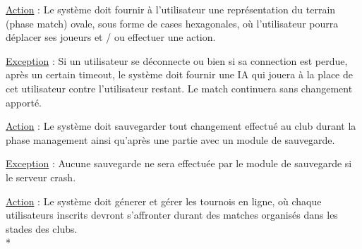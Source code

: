 \documentclass[a4paper]{article}
\begin{document}
\begin{description}[style=nextline]
			\item[Représentation phase match :]
			\begin{description}[leftmargin=*] %
				\item[]
				\item \underline{Action} : Le système doit fournir à l'utilisateur une représentation du terrain (phase match) ovale, sous forme de cases hexagonales, où l'utilisateur pourra déplacer ses joueurs et / ou effectuer une action.
				\item \underline{Exception} : Si un utilisateur se déconnecte ou bien si sa connection est perdue, après un certain timeout, le système doit fournir une IA qui jouera à la place de cet utilisateur contre l'utilisateur restant. Le match continuera sans changement apporté.
			\end{description} %
			
			\item[Sauvegarde :]
			\begin{description}[leftmargin=*] %
				\item[]
				\item \underline{Action} : Le système doit sauvegarder tout changement effectué au \gls{club} durant la phase management ainsi qu'après une partie avec un module de sauvegarde.
				\item \underline{Exception} : Aucune sauvegarde ne sera effectuée par le module de sauvegarde si le serveur crash.
			\end{description} %
			
			\item[Tournois :]
			\begin{description}[leftmargin=*] %
				\item[]
				\item \underline{Action} : Le système doit génerer et gérer les tournois en ligne, où chaque utilisateurs inscrits devront s'affronter durant des matches organisés dans les stades des clubs.\\*
			\end{description} %
			
		\end{description}
\end{document}
